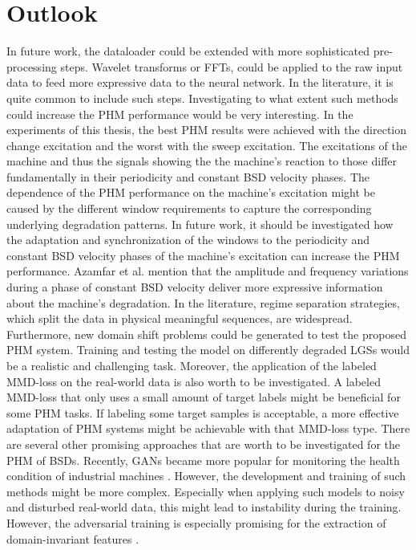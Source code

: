 \chapter{Outlook}
In future work, the dataloader could be extended with more sophisticated pre-processing steps. Wavelet transforms or FFTs, could be applied to the raw input data to feed more expressive data to the neural network. In the literature, it is quite common to include such steps. Investigating to what extent such methods could increase the PHM performance would be very interesting.
In the experiments of this thesis, the best PHM results were achieved with the direction change excitation and the worst with the sweep excitation. The excitations of the machine and thus the signals showing the the machine's reaction to those differ fundamentally in their periodicity and constant BSD velocity phases. The dependence of the PHM performance on the machine's excitation might be caused by the different window requirements to capture the corresponding underlying degradation patterns. In future work, it should be investigated how the adaptation and synchronization of the windows to the periodicity and constant BSD velocity phases of the machine's excitation can increase the PHM performance. Azamfar et al. \cite{AZAMFAR2020103932} mention that the amplitude and frequency variations during a phase of constant BSD velocity deliver more expressive information about the machine's degradation. In the literature, regime separation strategies, which split the data in physical meaningful sequences, are widespread.
Furthermore, new domain shift problems could be generated to test the proposed PHM system. Training and testing the model on differently degraded LGSs would be a realistic and challenging task.
Moreover, the application of the labeled MMD-loss on the real-world data is also worth to be investigated. A labeled MMD-loss that only uses a small amount of target labels might be beneficial for some PHM tasks.  If labeling some target samples is acceptable, a more effective adaptation of PHM systems might be achievable with that MMD-loss type.
There are several other promising approaches that are worth to be investigated for the PHM of BSDs. Recently, GANs became more popular for monitoring the health condition of industrial machines \cite{Zhang2019}. However, the development and training of such methods might be more complex. Especially when applying such models to noisy and disturbed real-world data, this might lead to instability during the training. However, the adversarial training is especially promising for the extraction of domain-invariant features \cite{Zhang2019}. 



